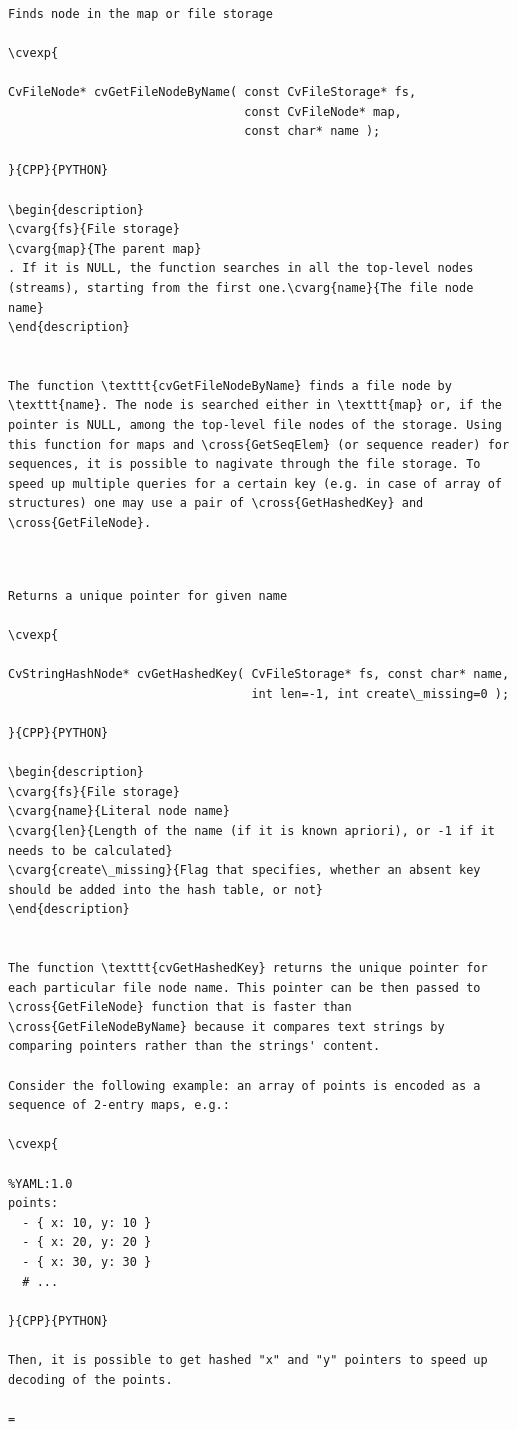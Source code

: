 \begin{verbatim}

Finds node in the map or file storage

\cvexp{

CvFileNode* cvGetFileNodeByName( const CvFileStorage* fs,
                                 const CvFileNode* map,
                                 const char* name );

}{CPP}{PYTHON}

\begin{description}
\cvarg{fs}{File storage}
\cvarg{map}{The parent map}
. If it is NULL, the function searches in all the top-level nodes (streams), starting from the first one.\cvarg{name}{The file node name}
\end{description}


The function \texttt{cvGetFileNodeByName} finds a file node by \texttt{name}. The node is searched either in \texttt{map} or, if the pointer is NULL, among the top-level file nodes of the storage. Using this function for maps and \cross{GetSeqElem} (or sequence reader) for sequences, it is possible to nagivate through the file storage. To speed up multiple queries for a certain key (e.g. in case of array of structures) one may use a pair of \cross{GetHashedKey} and \cross{GetFileNode}.


\end{verbatim}
\label{GetHashedKey}
\begin{verbatim}

Returns a unique pointer for given name

\cvexp{

CvStringHashNode* cvGetHashedKey( CvFileStorage* fs, const char* name,
                                  int len=-1, int create\_missing=0 );

}{CPP}{PYTHON}

\begin{description}
\cvarg{fs}{File storage}
\cvarg{name}{Literal node name}
\cvarg{len}{Length of the name (if it is known apriori), or -1 if it needs to be calculated}
\cvarg{create\_missing}{Flag that specifies, whether an absent key should be added into the hash table, or not}
\end{description}


The function \texttt{cvGetHashedKey} returns the unique pointer for each particular file node name. This pointer can be then passed to \cross{GetFileNode} function that is faster than \cross{GetFileNodeByName} because it compares text strings by comparing pointers rather than the strings' content.

Consider the following example: an array of points is encoded as a sequence of 2-entry maps, e.g.:

\cvexp{

%YAML:1.0
points:
  - { x: 10, y: 10 }
  - { x: 20, y: 20 }
  - { x: 30, y: 30 }
  # ...

}{CPP}{PYTHON}

Then, it is possible to get hashed "x" and "y" pointers to speed up decoding of the points.

=\end{verbatim}
